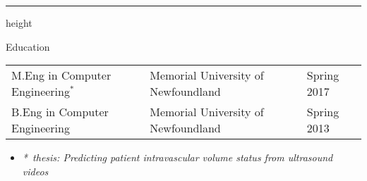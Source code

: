 \documentclass[calibri]{mcdowellcv}
\begin{document}
	\makeheader
	\hrule height \sectionheaderhrlueheight
	
	\begin{cvsection}{Education}
		\begin{tabu} to 1\textwidth { X[l]  X[1.5,c] X[.5,r] }
		M.Eng in Computer Engineering$^*$ & Memorial University of Newfoundland & Spring 2017 \\
		B.Eng in Computer Engineering & Memorial University of Newfoundland & Spring 2013 \\
		\end{tabu}

		\smallskip
		\begin{itemize}[label={}]
		\item\footnotesize{\textit{*~thesis: Predicting patient intravascular volume status from ultrasound videos}}
		\end{itemize}
		
	\end{cvsection}
	
\end{document}

